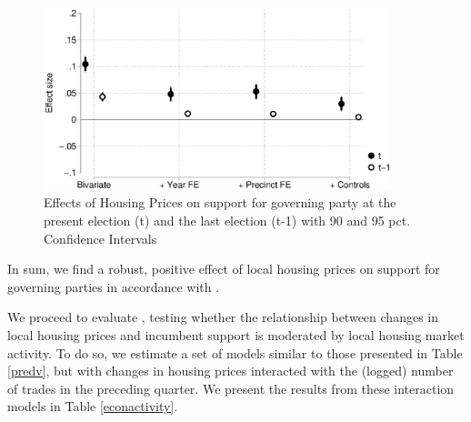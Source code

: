 \documentclass[12pt,a4paper]{article}
\begin{document}
	\begin{figure}[htbp!]
		\includegraphics[width=0.9\textwidth]{../figures/lagdv.eps}
		\centering
		\caption{Effects of Housing Prices on support for governing party at the present election (t) and the last election (t-1) with 90  and 95 pct. Confidence Intervals}\label{placebo}
	\end{figure}
	
	In sum, we find a robust, positive effect of local housing prices on support for governing parties in accordance with \hone.
	
	
	We proceed to evaluate \htwo, testing whether the relationship between changes in local housing prices and incumbent support is moderated by local housing market activity. To do so, we estimate a set of models similar to those presented in Table \ref{predv}, but with changes in housing prices interacted with the (logged) number of trades in the preceding quarter. We present the results from these interaction models in Table \ref{econactivity}.
	
	
	
\end{document}
